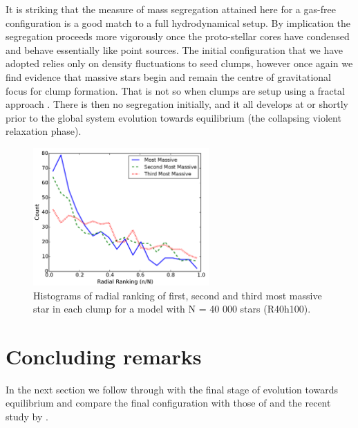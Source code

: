 It is striking that the measure of mass segregation attained here for a gas-free configuration is a good match to a full hydrodynamical setup. By implication the segregation proceeds more vigorously once the proto-stellar cores have condensed and behave essentially like point sources. The initial configuration that we have adopted relies only on density fluctuations to seed clumps, however once again we find evidence that massive stars begin and remain the centre of gravitational focus for clump formation. That is not so when clumps are setup using a fractal approach \citep{Goodwin2004,Allison2009}. There is then no segregation initially, and it all develops at or shortly prior to the global system evolution towards equilibrium (the collapsing violent relaxation phase). 


\begin{figure}
\begin{center}
\includegraphics[width=0.6\textwidth]{Figures/2_ClumpSeg}
\caption{Histograms of radial ranking of first, second and third most massive star in each clump for a model with N = 40 000 stars (R40h100).}
\label{Fig:2_ClumpSeg}
\end{center}
\end{figure}







\section{Concluding remarks}
In the next section we follow through with the final stage of evolution towards equilibrium and compare the final configuration with those of \cite{Allison2009} and the recent study by \cite{Caputo2014}. 